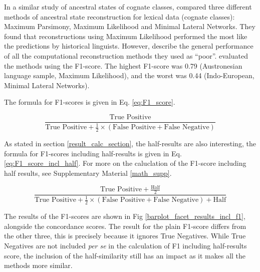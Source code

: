 \documentclass[12pt,letterpaper]{article}
\begin{document}
In a similar study of ancestral states of cognate classes, \citet{jager2018using} compared three different methods of ancestral state reconstruction for lexical data (cognate classes): Maximum Parsimony, Maximum Likelihood and Minimal Lateral Networks. They found that reconstructions using Maximum Likelihood performed the most like the predictions by historical linguists. However, \citet{jager2018using} describe the general performance of all the computational reconstruction methods they used as ``poor''. \citet{jager2018using} evaluated the methods using the F1-score. The highest F1-score was 0.79 (Austronesian language sample, Maximum Likelihood), and the worst was 0.44 (Indo-European, Minimal Lateral Networks).

The formula for F1-scores is given in Eq. \ref{eq:F1_score}.

\begin{equation}\label{eq:F1_score}
\frac{\text{True Positive} }
{\text{True Positive} + \frac{1}{2}\times(\text{False Positive} + \text{False Negative})}
\end{equation}

As stated in section \ref{result_calc_section}, the half-results are also interesting, the formula for F1-scores including half-results is given in Eq. \ref{eq:F1_score_incl_half}. For more on the caluclation of the F1-score including half results, see Supplementary Material \ref{math_supp}.

\begin{equation}\label{eq:F1_score_incl_half}
\frac{\text{True Positive} +  \frac{\text{Half}}{2}} 
{\text{True Positive} + \frac{1}{2}\times(\text{False Positive} + \text{False Negative}) + \text{Half}}
\end{equation}

The results of the F1-scores are shown in Fig \ref{barplot_facet_results_incl_f1}, alongside the concordance scores. The result for the plain F1-score differs from the other three, this is precisely because it ignores True Negatives. While True Negatives are not included \emph{per se} in the calculation of F1 including half-results score, the inclusion of the half-similarity still has an impact as it makes all the methods more similar.
\end{document}
